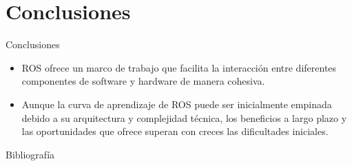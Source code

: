 \documentclass[
  24pt, %
  aspectratio=169, %
]{beamer}
\begin{document}
\section{Conclusiones}
\begin{frame}{Conclusiones}
  \begin{itemize}
  \item ROS ofrece un marco de trabajo que facilita la interacción entre diferentes componentes de software y hardware de manera cohesiva.
  \item Aunque la curva de aprendizaje de ROS puede ser inicialmente empinada debido a su arquitectura y complejidad técnica, los beneficios a largo plazo y las oportunidades que ofrece superan con creces las dificultades iniciales.
  \end{itemize}
\end{frame}


\begin{frame}{Bibliografía}
  \tiny
  
  
\end{frame}
\end{document}
